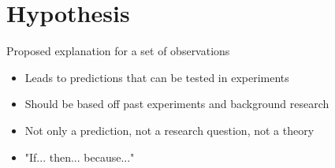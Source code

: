 \section{Hypothesis}
\begin{definition}[Hypothesis]\label{def:hypothesis}
    Proposed explanation for a set of observations
    \begin{itemize}
        \item Leads to predictions that can be tested in experiments
        \item Should be based off past experiments and background research
        \item Not only a prediction, not a research question, not a theory
        \item "If... then... because..."
    \end{itemize}
\end{definition}